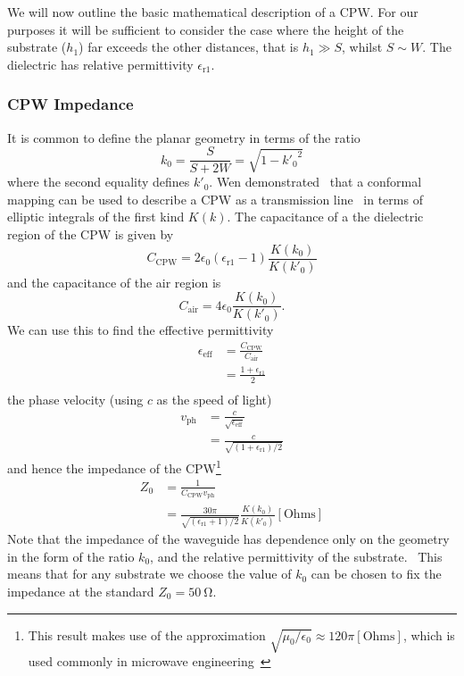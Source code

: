 We will now outline the basic mathematical description of a CPW.  For our
purposes it will be sufficient to consider the case where the height of the
substrate ($h_1$) far exceeds the other distances, that is $h_1 \gg S$, whilst
$S \sim W$. The dielectric has relative permittivity $\epsilon_\mathrm{r1}$.

\subsubsection{CPW Impedance}

It is common to define the planar geometry in terms of the
ratio~\cite{1127105, Simons2004}
\begin{equation}
  k_0 = \frac{S}{S+2W} = \sqrt{1-{k'_0}^2}
  \label{eqn:k0def}
\end{equation}
where the second equality defines $k'_0$.
%
Wen demonstrated~\cite{1127105} that a conformal mapping  can be used
to describe a CPW as a transmission line~\cite{Jackson1975} in terms of elliptic
integrals of the first kind $K(k)$. The capacitance of a the dielectric region
of the CPW is given by
\begin{equation}
  C_\mathrm{CPW} = 2\epsilon_0(\epsilon_\mathrm{r1}-1)\frac{K(k_0)}{K(k'_0)}
\end{equation}
and the capacitance of the air region is
\begin{equation}
  C_\mathrm{air} = 4\epsilon_0 \frac{K(k_0)}{K(k'_0)}.
\end{equation}
We can use this to find the effective permittivity 
\begin{align}
  \epsilon_\mathrm{eff} &= \frac{C_\mathrm{CPW}}{C_\mathrm{air}} \\
    &= \frac{1+ \epsilon_\mathrm{r1}}{2} \\
\end{align}
the phase velocity (using $c$ as the speed of light)
\begin{align}
  v_\mathrm{ph} &= \frac{c}{\sqrt{\epsilon_\mathrm{eff}}} \\
    &= \frac{c}{\sqrt{(1 + \epsilon_\mathrm{r1})/2}}
\end{align}
and hence the impedance of the CPW\footnote{This result makes use of the
approximation $\sqrt{\mu_0/\epsilon_0}\approx120\pi\mathrm{[Ohms]}$, which is
used commonly in microwave engineering~\cite{Collin2007}}
\begin{align}
  Z_0 &= \frac{1}{C_\mathrm{CPW} v_\mathrm{ph}} \\
    &= \frac{30 \pi}{\sqrt{(\epsilon_\mathrm{r1}+1)/2}} \frac{K(k_0)}{K(k'_0)}
    \mathrm{[Ohms]}
\end{align}
Note that the impedance of the waveguide has dependence only on the geometry in
the form of the ratio $k_0$, and the relative permittivity of the
substrate.~\cite{Simons2004} This means that for any substrate we choose the
value of $k_0$ can be chosen to fix the impedance at the standard $Z_0 =
\SI{50}{\ohm}$.

